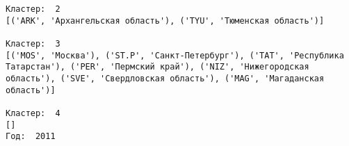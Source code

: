 \documentclass[11pt]{article}
\begin{document}
\begin{Verbatim}[commandchars=\\\{\}]
Кластер:  2
[('ARK', 'Архангельская область'), ('TYU', 'Тюменская область')]

Кластер:  3
[('MOS', 'Москва'), ('ST.P', 'Санкт-Петербург'), ('TAT', 'Республика Татарстан'), ('PER', 'Пермский край'), ('NIZ', 'Нижегородская область'), ('SVE', 'Свердловская область'), ('MAG', 'Магаданская область')]

Кластер:  4
[]
Год:  2011

    \end{Verbatim}

    \begin{center}
    \end{center}
    { \hspace*{\fill} \\}
    
\end{document}
